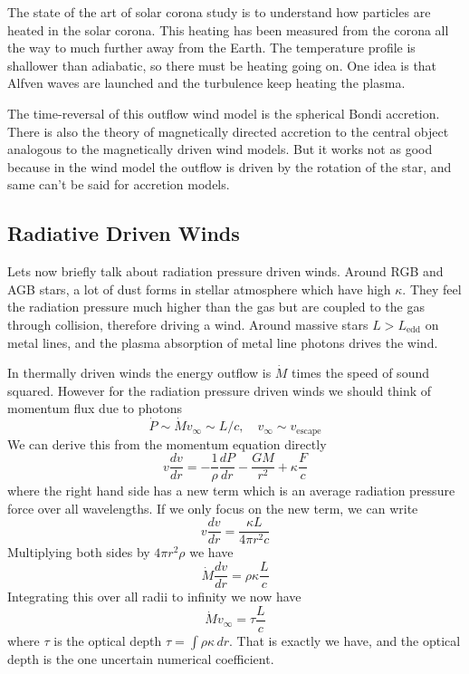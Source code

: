 \documentclass[letterpaper, 11pt]{article}
\numberwithin{equation}{section}
\numberwithin{figure}{section}
\begin{document}
The state of the art of solar corona study is to understand how particles are
heated in the solar corona. This heating has been measured from the corona all
the way to much further away from the Earth. The temperature profile is
shallower than adiabatic, so there must be heating going on. One idea is that
Alfven waves are launched and the turbulence keep heating the plasma.

The time-reversal of this outflow wind model is the spherical Bondi accretion.
There is also the theory of magnetically directed accretion to the central object
analogous to the magnetically driven wind models. But it works not as good
because in the wind model the outflow is driven by the rotation of the star, and
same can't be said for accretion models.

\subsection{Radiative Driven Winds}

Lets now briefly talk about radiation pressure driven winds. Around RGB and AGB
stars, a lot of dust forms in stellar atmosphere which have high $\kappa$. They
feel the radiation pressure much higher than the gas but are coupled to the gas
through collision, therefore driving a wind. Around massive stars $L >
L_\mathrm{edd}$ on metal lines, and the plasma absorption of metal line photons
drives the wind.

In thermally driven winds the energy outflow is $\dot{M}$ times the speed of
sound squared. However for the radiation pressure driven winds we should think
of momentum flux due to photons
\begin{equation}
  \label{eq:19}
  \dot{P} \sim \dot{M}v_{\infty} \sim L/c,\quad v_{\infty} \sim v_\mathrm{escape}
\end{equation}
We can derive this from the momentum equation directly
\begin{equation}
  \label{eq:20}
  v\frac{dv}{dr} = -\frac{1}{\rho}\frac{dP}{dr} - \frac{GM}{r^2} + \kappa \frac{F}{c}
\end{equation}
where the right hand side has a new term which is an average radiation pressure
force over all wavelengths. If we only focus on the new term, we can write
\begin{equation}
  \label{eq:21}
  v\frac{dv}{dr} = \frac{\kappa L}{4\pi r^2 c}
\end{equation}
Multiplying both sides by $4\pi r^{2}\rho$ we have
\begin{equation}
  \label{eq:22}
  \dot{M}\frac{dv}{dr} = \rho\kappa\frac{L}{c}
\end{equation}
Integrating this over all radii to infinity we now have
\begin{equation}
  \label{eq:23}
  \dot{M}v_{\infty} = \tau\frac{L}{c}
\end{equation}
where $\tau$ is the optical depth $\tau = \int \rho\kappa\,dr$. That is exactly
we have, and the optical depth is the one uncertain numerical coefficient.
\end{document}
